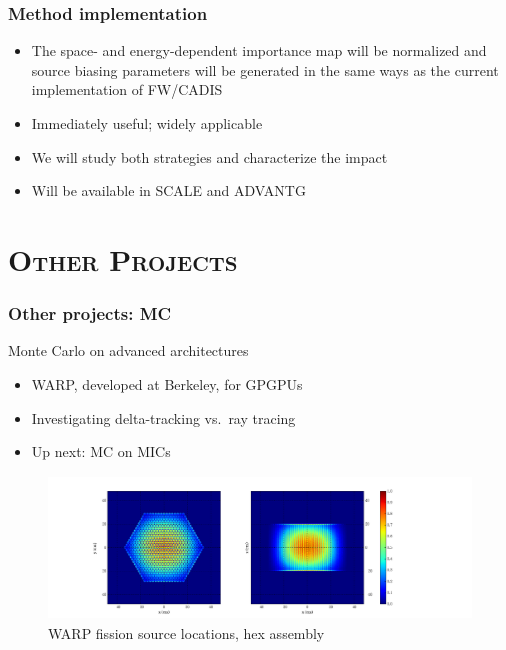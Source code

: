 \documentclass[xcolor=x11names,compress]{beamer}
\renewcommand{\(}{\begin{columns}}
\renewcommand{\)}{\end{columns}}
\newcommand{\<}[1]{\begin{column}{#1}}
\renewcommand{\>}{\end{column}}
\begin{document}
\begin{frame}[fragile]
  \frametitle{Method implementation}

  	\begin{itemize}
    \item The space- and energy-dependent importance map will be normalized and 
     source biasing parameters will be generated in the \alert{same ways} as
     the current implementation of FW/CADIS \vspace*{1 em}
	\item Immediately useful; widely applicable \vspace*{1 em}
	\item We will study both strategies and characterize the impact\vspace*{1 em}
	\item Will be available in SCALE \cite{SCALE} and ADVANTG \cite{Pantelias2013}
	\end{itemize}
	
\end{frame}


\section{\scshape Other Projects}
\begin{frame}[fragile]
  \frametitle{Other projects: MC}
  
Monte Carlo on advanced architectures

  	\begin{itemize}
  	\item WARP, developed at Berkeley, for GPGPUs
  	\item Investigating delta-tracking vs.\ ray tracing
  	\item Up next: MC on MICs
	\end{itemize}	
	\begin{center}
 	 \begin{figure}
 	 \includegraphics[height=1.5in,clip]{assembly-fiss-6}  
 	 \caption{WARP fission source locations, hex assembly}
 	 \end{figure}
 	\end{center}
  
\end{frame}	
\end{document}
